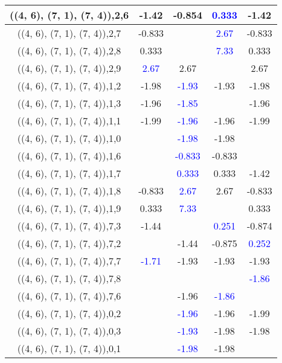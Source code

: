 \documentclass{article}
\begin{document}
\begin{center}
\begin{longtable}{|c|c|c|c|c|}
        	\hline
        	((4, 6), (7, 1), (7, 4)),2,6&-1.42&-0.854& \textcolor{blue}{0.333}&-1.42\\
        	\hline
        	((4, 6), (7, 1), (7, 4)),2,7&-0.833&& \textcolor{blue}{2.67}&-0.833\\
        	\hline
        	((4, 6), (7, 1), (7, 4)),2,8&0.333&& \textcolor{blue}{7.33}&0.333\\
        	\hline
        	((4, 6), (7, 1), (7, 4)),2,9& \textcolor{blue}{2.67}&2.67&&2.67\\
        	\hline
        	((4, 6), (7, 1), (7, 4)),1,2&-1.98& \textcolor{blue}{-1.93}&-1.93&-1.98\\
        	\hline
        	((4, 6), (7, 1), (7, 4)),1,3&-1.96& \textcolor{blue}{-1.85}&&-1.96\\
        	\hline
        	((4, 6), (7, 1), (7, 4)),1,1&-1.99& \textcolor{blue}{-1.96}&-1.96&-1.99\\
        	\hline
        	((4, 6), (7, 1), (7, 4)),1,0&& \textcolor{blue}{-1.98}&-1.98&\\
        	\hline
        	((4, 6), (7, 1), (7, 4)),1,6&& \textcolor{blue}{-0.833}&-0.833&\\
        	\hline
        	((4, 6), (7, 1), (7, 4)),1,7&& \textcolor{blue}{0.333}&0.333&-1.42\\
        	\hline
        	((4, 6), (7, 1), (7, 4)),1,8&-0.833& \textcolor{blue}{2.67}&2.67&-0.833\\
        	\hline
        	((4, 6), (7, 1), (7, 4)),1,9&0.333& \textcolor{blue}{7.33}&&0.333\\
        	\hline
        	((4, 6), (7, 1), (7, 4)),7,3&-1.44&& \textcolor{blue}{0.251}&-0.874\\
        	\hline
        	((4, 6), (7, 1), (7, 4)),7,2&&-1.44&-0.875& \textcolor{blue}{0.252}\\
        	\hline
        	((4, 6), (7, 1), (7, 4)),7,7& \textcolor{blue}{-1.71}&-1.93&-1.93&-1.93\\
        	\hline
        	((4, 6), (7, 1), (7, 4)),7,8&&&& \textcolor{blue}{-1.86}\\
        	\hline
        	((4, 6), (7, 1), (7, 4)),7,6&&-1.96& \textcolor{blue}{-1.86}&\\
        	\hline
        	((4, 6), (7, 1), (7, 4)),0,2&& \textcolor{blue}{-1.96}&-1.96&-1.99\\
        	\hline
        	((4, 6), (7, 1), (7, 4)),0,3&& \textcolor{blue}{-1.93}&-1.98&-1.98\\
        	\hline
        	((4, 6), (7, 1), (7, 4)),0,1&& \textcolor{blue}{-1.98}&-1.98&\\

\end{longtable}
\end{center}
\end{document}
